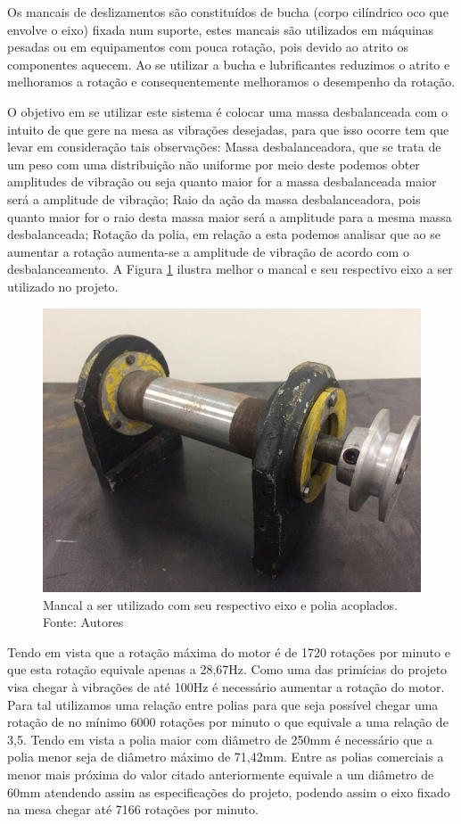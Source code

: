     Os mancais de deslizamentos são constituídos de bucha (corpo cilíndrico oco que envolve o eixo) fixada num suporte, estes mancais são utilizados em máquinas pesadas ou em equipamentos com pouca rotação, pois devido ao atrito os componentes aquecem. Ao se utilizar a bucha e lubrificantes reduzimos o atrito e melhoramos a rotação e consequentemente melhoramos o desempenho da rotação.

    O objetivo em se utilizar este sistema é colocar uma massa desbalanceada com o intuito de que gere na mesa as vibrações desejadas, para que isso ocorre tem que levar em consideração tais observações: Massa desbalanceadora, que se trata de um peso com uma distribuição não uniforme por meio deste podemos obter amplitudes de vibração ou seja quanto maior for a massa desbalanceada maior será a amplitude de vibração; Raio da ação da massa desbalanceadora, pois quanto maior for o raio desta massa maior será a amplitude para a mesma massa desbalanceada; Rotação da polia, em relação a esta podemos analisar que ao se aumentar a rotação aumenta-se a amplitude de vibração de acordo com o desbalanceamento. A Figura \ref{fig:mancal} ilustra melhor o mancal e seu respectivo eixo a ser utilizado no projeto.

\begin{figure}[H]
\centering
\includegraphics[scale=0.9]{figuras/mancal.jpg}
\caption{Mancal a ser utilizado com seu respectivo eixo e polia acoplados. Fonte: Autores}
\label{fig:mancal}
\end{figure}


    Tendo em vista que a rotação máxima do motor é de 1720 rotações por minuto e que esta rotação equivale apenas a 28,67Hz. Como uma das primícias do projeto visa chegar à vibrações de até 100Hz é necessário aumentar a rotação do motor. Para tal utilizamos uma relação entre polias para que seja possível chegar uma rotação de no mínimo 6000 rotações por minuto o que equivale a uma relação de 3,5. Tendo em vista a polia maior com diâmetro de 250mm é necessário que a polia menor seja de diâmetro máximo de 71,42mm. Entre as polias comerciais a menor mais próxima do valor citado anteriormente equivale a um diâmetro de 60mm atendendo assim as especificações do projeto, podendo assim o eixo fixado na mesa chegar até 7166 rotações por minuto.
